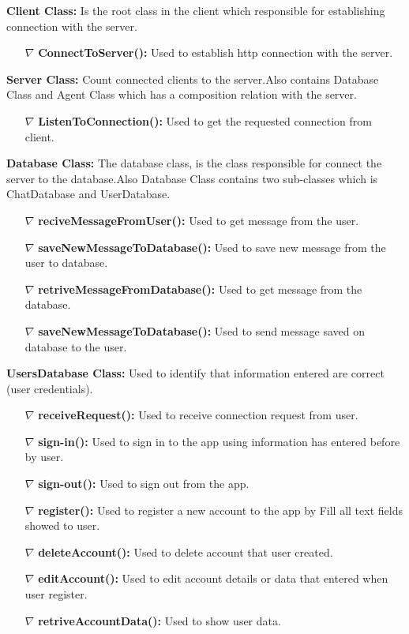 \documentclass{scrreprt}
\begin{document}
\textbf{Client Class:} Is the root class in the client which responsible for establishing connection with the server.
\begin{itemize}
	\item[$\nabla$] \textbf{ConnectToServer():} Used to establish http connection with the server.
\end{itemize}

\textbf{Server Class:} Count connected clients to the server.Also contains Database Class and Agent Class which has a composition relation with the server. 
\begin{itemize}
	\item[$\nabla$] \textbf{ListenToConnection():} Used to get the requested connection from client.
\end{itemize}

\textbf{Database Class:} The database class, is the class responsible for connect the server to the database.Also Database Class contains two sub-classes which is ChatDatabase and UserDatabase.
\begin{itemize}
	\item[$\nabla$] \textbf{reciveMessageFromUser():} Used to get message from the user.
	\item[$\nabla$] \textbf{saveNewMessageToDatabase():} Used to save new  message from the user to database.
	\item[$\nabla$] \textbf{retriveMessageFromDatabase():} Used to get message from the database.
	\item[$\nabla$] \textbf{saveNewMessageToDatabase():} Used to send message saved on database to the user.
\end{itemize}

\textbf{UsersDatabase Class:} Used to identify that information entered are correct (user credentials).
\begin{itemize}
	\item[$\nabla$] \textbf{receiveRequest():} Used to receive connection request from user.
	\item[$\nabla$] \textbf{sign-in():} Used to sign in to the app using information has entered before by user.
	\item[$\nabla$] \textbf{sign-out():} Used to sign out from the app.
	\item[$\nabla$] \textbf{register():} Used to register a new account to the app by Fill all text fields showed to user.
	\item[$\nabla$] \textbf{deleteAccount():} Used to delete account that user created.
	\item[$\nabla$] \textbf{editAccount():} Used to edit account details or data that entered when user register.
	\item[$\nabla$] \textbf{retriveAccountData():} Used to show user data.
\end{itemize}
\end{document}

